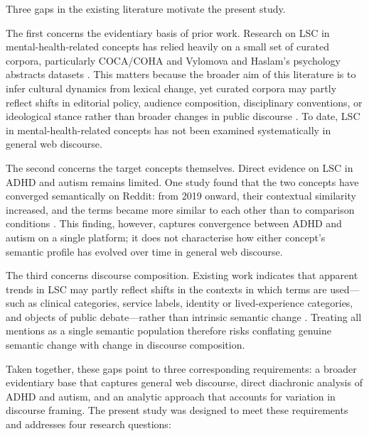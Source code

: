 Three gaps in the existing literature motivate the present study.

The first concerns the evidentiary basis of prior work. Research on LSC in mental-health-related concepts has relied heavily on a small set of curated corpora, particularly COCA/COHA and Vylomova and Haslam's \citeyearpar{vylomovaSemanticChangesHarmrelated2021} psychology abstracts datasets \citep[e.g.,][]{baesSemanticShiftsMental2023,baesMultidimensionalFrameworkEvaluating2024,xiaoHaveConceptsAnxiety2023,iacobComputationalAnalysisEmergence2026}. This matters because the broader aim of this literature is to infer cultural dynamics from lexical change, yet curated corpora may partly reflect shifts in editorial policy, audience composition, disciplinary conventions, or ideological stance rather than broader changes in public discourse \citep{pislRevisitingSemanticSeverity2025}. To date, LSC in mental-health-related concepts has not been examined systematically in general web discourse.

The second concerns the target concepts themselves. Direct evidence on LSC in ADHD and autism remains limited. One study found that the two concepts have converged semantically on Reddit: from 2019 onward, their contextual similarity increased, and the terms became more similar to each other than to comparison conditions \citep{kangConvergingRepresentationsAttentionDeficit2025}. This finding, however, captures convergence between ADHD and autism on a single platform; it does not characterise how either concept's semantic profile has evolved over time in general web discourse.

The third concerns discourse composition. Existing work indicates that apparent trends in LSC may partly reflect shifts in the contexts in which terms are used---such as clinical categories, service labels, identity or lived-experience categories, and objects of public debate---rather than intrinsic semantic change \citep{pislRevisitingSemanticSeverity2025,xiaoHaveConceptsAnxiety2023}. Treating all mentions as a single semantic population therefore risks conflating genuine semantic change with change in discourse composition.

Taken together, these gaps point to three corresponding requirements: a broader evidentiary base that captures general web discourse, direct diachronic analysis of ADHD and autism, and an analytic approach that accounts for variation in discourse framing. The present study was designed to meet these requirements and addresses four research questions:

